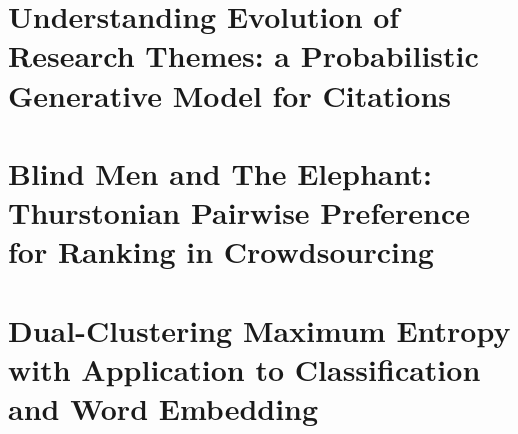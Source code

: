 \documentclass[edeposit,fullpage]{uiucthesis2009}
\theoremstyle{plain}
\theoremstyle{definition}
\theoremstyle{remark}
\newcommand{\DCME}{Dual-Clustering Maximum Entropy}
\begin{document}
\tableofcontents
\listoftables
\listoffigures





\mainmatter




\chapter{Understanding Evolution of Research Themes: a Probabilistic Generative
Model for Citations}\label{chp::clda}


\chapter{Blind Men and The Elephant: Thurstonian Pairwise Preference for Ranking
in Crowdsourcing}\label{chp::tpp}







\chapter{\DCME{} \\ with Application to Classification and Word
Embedding}\label{chp::dcme}





\end{document}
